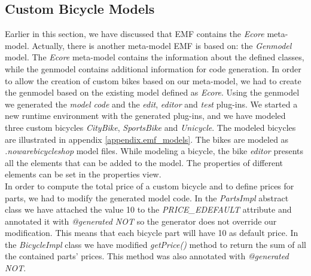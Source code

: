 \subsection{Custom Bicycle Models}
Earlier in this section, we have discussed that EMF contains the \emph{Ecore}
meta-model. Actually, there is another meta-model EMF is based on:
the \emph{Genmodel} model. The \emph{Ecore} meta-model contains the information about
the defined classes, while the genmodel contains additional information for
code generation. In order to allow the creation of custom bikes based on our
meta-model, we had to create the genmodel based on the existing model defined as
\emph{Ecore}. Using the genmodel we generated the \emph{model code} and the
\emph{edit}, \emph{editor} and \emph{test} plug-ins. We started a new runtime
environment with the generated plug-ins, and we have modeled three custom bicycles
\emph{CityBike}, \emph{SportsBike} and \emph{Unicycle}. The modeled bicycles are
illustrated in appendix \ref{appendix.emf_models}. The bikes are modeled as
\emph{.nowarebicycleshop} model files. While modeling a bicycle, the bike
\emph{editor} presents all the elements that can be added to the model. The
properties of different elements can be set in the properties view.\\

In order to compute the total price of a custom bicycle and to define
prices for parts, we had to modify the generated model code. In the
\emph{PartsImpl} abstract class we have attached the value
10 to the \emph{PRICE\_EDEFAULT} attribute and annotated it with
\emph{@generated NOT} so the generator does not override our modification. This
means that each bicycle part will have 10 as default price. In the
\emph{BicycleImpl} class we have modified \emph{getPrice()} method to return the
sum of all the contained parts' prices. This method was also annotated with
\emph{@generated NOT}.

